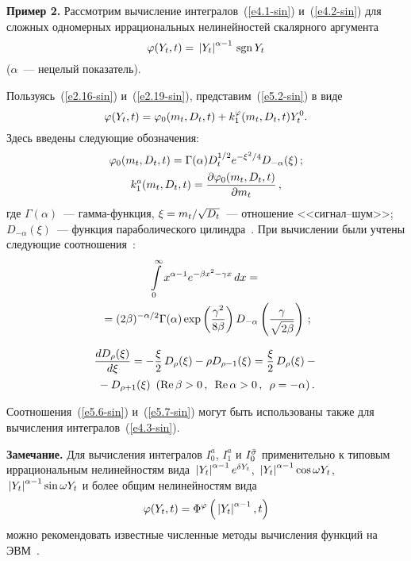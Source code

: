 \begin{multicols}{2}
\medskip

\noindent
\textbf{Пример 2.}
Рассмотрим вычисление интегралов~(\ref{e4.1-sin}) и~(\ref{e4.2-sin})
для сложных одномерных иррациональных нелинейностей скалярного аргумента
\begin{equation}
\varphi (Y_t, t) =\,\left\vert Y_t\right\vert^{\alpha-1}\, \mathrm{sgn}\, Y_t
\label{e5.2-sin}
\end{equation}
($\alpha$~--- нецелый показатель).

Пользуясь~(\ref{e2.16-sin}) и~(\ref{e2.19-sin}), представим~(\ref{e5.2-sin}) в виде
\begin{equation*}
\vrp(Y_t, t) = \vrp_0 (m_t, D_t, t) + k_1^\vrp(m_t, D_t, t) Y_t^0. %
\end{equation*}
Здесь введены следующие обозначения:
\begin{gather*}
\vrp_0(m_t, D_t, t) =\Gamma(\alpha) D_t^{1/2} e^{-\xi^2/4} D_{-\alpha} (\xi)\,;%
\\
k_1^a (m_t, D_t, t) =\fr {\prt \vrp_0(m_t, D_t, t)}{\prt m_t}\,,%
\end{gather*}
где  $\Gamma(\alpha)$~--- гамма-функция,  $\xi \hm= m_t/\sqrt{D_t}$~---
отношение <<сиг\-нал--шум>>; $D_{-\alpha} (\xi)$~---
функция параболического цилиндра~\cite{9-sin}.
При вычислении были учтены следующие соотношения~\cite{9-sin, 8-sin}:
\begin{multline}
\int\limits_0^\infty x^{\alpha-1} e^{-\beta x^2 - \gamma x} \,dx ={}\\
{}=
(2\beta)^{-\alpha/2} \Gamma(\alpha) \exp \left(\displaystyle\frac{\displaystyle \gamma^2\mathstrut}{\displaystyle 8\beta\mathstrut}\right)
D_{-\alpha} \left(\displaystyle\frac{\displaystyle \gamma\mathstrut}{\displaystyle \sqrt{2\beta}\mathstrut}\right)\,;\label{e5.6-sin}
\end{multline}

\vspace*{-12pt}

\noindent
\begin{multline}
\displaystyle\frac{\displaystyle dD_\rho(\xi)\mathstrut}{\displaystyle d\xi\mathstrut} =
   -\displaystyle\frac{\displaystyle \xi\mathstrut}{\displaystyle 2\mathstrut}\, D_\rho (\xi) -\rho D_{\rho-1} (\xi) =
   \displaystyle\frac{\displaystyle \xi\mathstrut}{\displaystyle 2\mathstrut}\, D_\rho (\xi) -{}\\
   {}- D_{\rho+1} (\xi) \enskip
   (\mathrm{Re}\, \beta>0\,,\enskip \mathrm{Re}\,\alpha>0\,,\enskip
   \rho=-\alpha)\,.\label{e5.7-sin}
   \end{multline}

Соотношения~(\ref{e5.6-sin}) и~(\ref{e5.7-sin})
могут быть использованы также для вычисления интегралов~(\ref{e4.3-sin}).

\medskip

\noindent
\textbf{Замечание.}
Для вычисления интегралов $I_0^a$, $I_1^a$ и $I_0^{\bar {\sigma}}$
применительно к типовым иррациональным нелинейностям вида
    $\,\left\vert Y_t\right\vert^{\alpha-1} e^{\delta Y_t}$, $\,\left\vert Y_t\right\vert^{\alpha-1}  \cos \omega Y_t$,
    $\,\left\vert Y_t\right\vert^{\alpha-1}  \sin \omega Y_t$
и более общим нелинейностям \mbox{вида}
    \begin{equation*}
    \vrp (Y_t, t) =\Phi^\vrp \left( \lv Y_t\rrv^{\alpha-1}, t\right) %
    \end{equation*}
можно рекомендовать известные численные методы вычисления функций на ЭВМ~\cite{8-sin}.


\end{multicols}
